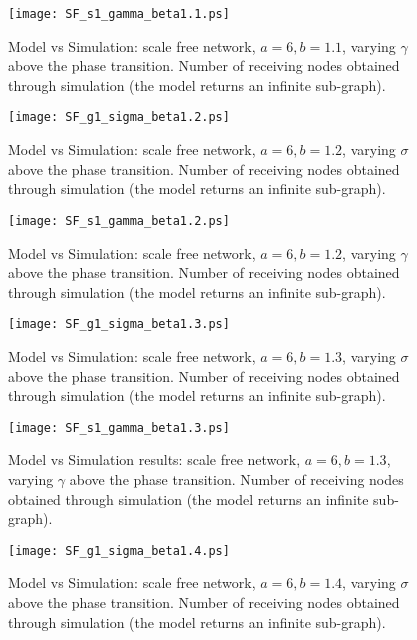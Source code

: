 \documentclass[10pt, conference, compsocconf]{IEEEtran}
\begin{document}
\begin{figure}[t]
   \centering
   \texttt{[image: SF\_s1\_gamma\_beta1.1.ps]}
   \caption{Model vs Simulation: scale free network, $a = 6, b = 1.1$, varying $\gamma$ above the phase transition. Number of receiving nodes obtained through simulation (the model returns an infinite sub-graph).}
   \label{fig:SF_confronto_s_beta1.1}
\end{figure}

\begin{figure}[t]
   \centering
   \texttt{[image: SF\_g1\_sigma\_beta1.2.ps]}
   \caption{Model vs Simulation: scale free network, $a = 6, b = 1.2$, varying $\sigma$ above the phase transition. Number of receiving nodes obtained through simulation (the model returns an infinite sub-graph).}
   \label{fig:SF_confronto_g_beta1.2}
\end{figure}

\begin{figure}[t]
   \centering
   \texttt{[image: SF\_s1\_gamma\_beta1.2.ps]}
   \caption{Model vs Simulation: scale free network, $a = 6, b = 1.2$, varying $\gamma$ above the phase transition. Number of receiving nodes obtained through simulation (the model returns an infinite sub-graph).}
   \label{fig:SF_confronto_s_beta1.2}
\end{figure}

\begin{figure}[t]
   \centering
   \texttt{[image: SF\_g1\_sigma\_beta1.3.ps]}
   \caption{Model vs Simulation: scale free network, $a = 6, b = 1.3$, varying $\sigma$ above the phase transition. Number of receiving nodes obtained through simulation (the model returns an infinite sub-graph).}
   \label{fig:SF_confronto_g_beta1.3}
\end{figure}

\begin{figure}[t]
   \centering
   \texttt{[image: SF\_s1\_gamma\_beta1.3.ps]}
   \caption{Model vs Simulation results: scale free network, $a = 6, b = 1.3$, varying $\gamma$ above the phase transition. Number of receiving nodes obtained through simulation (the model returns an infinite sub-graph).}
   \label{fig:SF_confronto_s_beta1.3}
\end{figure}

\begin{figure}[t]
   \centering
   \texttt{[image: SF\_g1\_sigma\_beta1.4.ps]}
   \caption{Model vs Simulation: scale free network, $a = 6, b = 1.4$, varying $\sigma$ above the phase transition. Number of receiving nodes obtained through simulation (the model returns an infinite sub-graph).}
   \label{fig:SF_confronto_g_beta1.4}
\end{figure}
\end{document}
